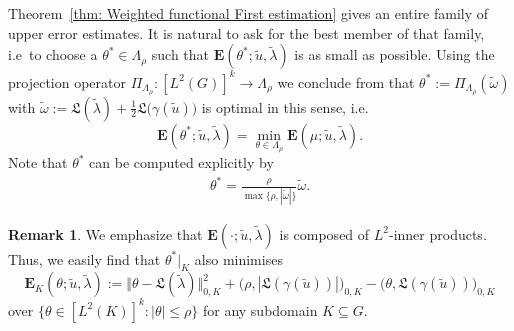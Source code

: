 \documentclass[12pt,twoside,reqno]{amsart}
\theoremstyle{definition}
\newtheorem{remark}{Remark}[section]
\numberwithin{equation}{section}
\renewcommand{\L}{\mathfrak{L}}
\newcommand{\E} {\bm{E}}
\newcommand{\norm}[1]    {\Vert #1 \Vert}
\begin{document}

   Theorem~\ref{thm: Weighted functional First estimation} gives an entire family of upper error estimates. It is natural to ask for the best member of that family, i.e~to choose a $\theta^*\in\Lambda_\rho$ such that $\E(\theta^*;\tilde{u},\tilde{\lambda})$ is as small as possible. 
    Using the projection operator $\Pi_{\Lambda_\rho}:[L^2(G)]^k\to\Lambda_\rho$  we conclude from \cite[Lem.~16]{Bammer2025e} that ${\theta}^*:= \Pi_{\Lambda_\rho}(\tilde{\omega})$
    with $\tilde{\omega}:=\L(\tilde{\lambda})+\frac12\L\big(\gamma(\tilde{u})\big)$ is optimal in this sense, i.e.
    \begin{equation} \label{eq:optimal_Prop_theta_star}
            \E(\theta^*;\tilde{u},\tilde{\lambda})=\min\limits_{{\theta}\in \Lambda_\rho}\E(\mu;\tilde{u},\tilde{\lambda}).
        \end{equation}
    Note that $\theta^*$ can be computed explicitly by  
    \begin{align} \label{eq:optimal_theta_star}
    \theta^*= \frac{\rho}{\max\{\rho,|\tilde{\omega}|\}}\tilde{\omega}.
    \end{align}

    
   
    \begin{remark} \label{rem:subsetMinimizer}
        We emphasize that $\E(\cdot; \tilde{u},\tilde{\lambda})$ is composed of $L^2$-inner products. Thus, we easily find that $\theta^*|_K$ also minimises
        \begin{equation*}
            \E_K(\theta; \tilde{u},\tilde{\lambda}):=\norm{{\theta}-\L(\tilde{\lambda})}_{0,K}^2+\bigl(\rho,|\L(\gamma(\tilde{u}))|\bigr)_{0,K}-\bigl(\theta,\L(\gamma(\tilde{u}))\bigr)_{0,K}
        \end{equation*}
        over $\{\theta \in [L^2(K)]^k: |\theta|\leq \rho\}$
        for any subdomain $K\subseteq G$. 
    \end{remark}




    

\end{document}
